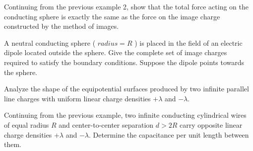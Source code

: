 \begin{example}
    Continuing from the previous example 2, show that the total force acting on the conducting sphere is exactly the same as the force on the image charge constructed by the method of images.
\end{example}

\begin{example}
    A neutral conducting sphere ( \(radius = R\) ) is placed in the field of an electric dipole located outside the sphere. Give the complete set of image charges required to satisfy the boundary conditions. Suppose the dipole points towards the sphere.
\end{example}

\begin{example}
    Analyze the shape of the equipotential surfaces produced by two infinite parallel line charges with uniform linear charge densities \(+\lambda\) and \(-\lambda\).
\end{example}

\begin{example}
    Continuing from the previous example, two infinite conducting cylindrical wires of equal radius \(R\) and center-to-center separation \(d>2R\) carry opposite linear charge densities \(+\lambda\) and \(-\lambda\). Determine the capacitance per unit length between them.
\end{example}